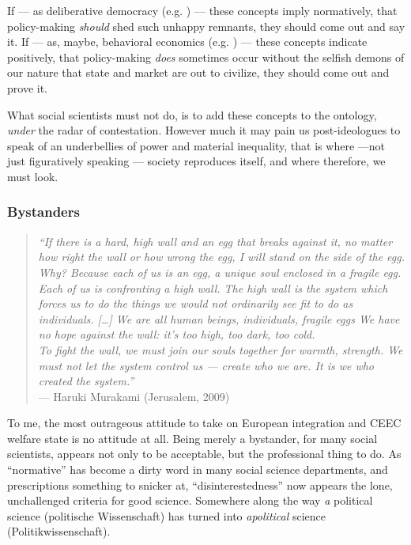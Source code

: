 \documentclass[11pt,a4paper,oneside,openright]{article}
\begin{document}
If --- as deliberative democracy (e.g. \citealt{Elster-1998-aa}) --- these concepts imply normatively, that policy-making \emph{should} shed such unhappy remnants, they should come out and say it. 
If --- as, maybe, behavioral economics (e.g. \citealt{Tomasello2009}) --- these concepts indicate positively, that policy-making \emph{does} sometimes occur without the selfish demons of our nature that state and market are out to civilize, they should come out and prove it. 

What social scientists must not do, is to add these concepts to the ontology, \emph{under} the radar of contestation. 
However much it may pain us post-ideologues to speak of \citeauthor{Agnoli-1989-aa}an underbellies of power and material inequality, that is where ---not just figuratively speaking --- society reproduces itself, and where therefore, we must look.

\subsubsection{Bystanders}

\begin{quote}
	\emph{``If there is a hard, high wall and an egg that breaks against it, no matter how right the wall or how wrong the egg, I will stand on the side of the egg. \\
	Why? 
	Because each of us is an egg, a unique soul enclosed in a fragile egg. 
	Each of us is confronting a high wall. 
	The high wall is the system which forces us to do the things we would not ordinarily see fit to do as individuals. 
	[\ldots] 
	We are all human beings, individuals, fragile eggs
	We have no hope against the wall: 
	it's too high, too dark, too cold. \\
	To fight the wall, we must join our souls together for warmth, strength. 
	We must not let the system control us --- create who we are. It is we who created the system.''}\\
	--- Haruki Murakami (Jerusalem, 2009)
\end{quote}

To me, the most outrageous attitude to take on European integration and \gls{CEEC} welfare state is no attitude at all. 
Being merely a bystander, for many social scientists, appears not only to be acceptable, but the professional thing to do. 
As ``normative'' has become a dirty word in many social science departments, and prescriptions something to snicker at, ``disinterestedness'' now appears the lone, unchallenged criteria for good science. 
Somewhere along the way \emph{a} political science (politische Wissenschaft) has turned into \emph{apolitical} science (Politikwissenschaft).
\end{document}

